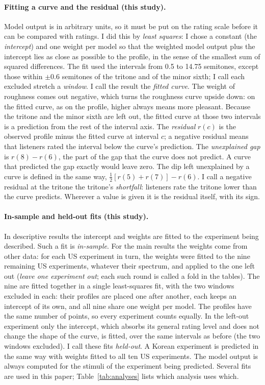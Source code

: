 \documentclass[11pt,a4paper]{article}
\begin{document}
\paragraph{Fitting a curve and the residual (this study).}
Model output is in arbitrary units, so it must be put on the rating scale before it can be
compared with ratings. I did this by \emph{least squares}: I chose a constant (the
\emph{intercept}) and one weight per model so that the weighted model output plus the
intercept lies as close as possible to the profile, in the sense of the smallest sum of
squared differences. The fit used the intervals from 0.5 to 14.75 semitones, except those
within $\pm0.6$ semitones of the tritone and of the minor sixth; I call each excluded stretch a
\emph{window}. I call the result the
\emph{fitted curve}. The weight of roughness comes out negative, which turns the roughness
curve upside down: on the fitted curve, as on the profile, higher always means more pleasant. Because the tritone and the minor sixth are left out, the fitted curve
at those two intervals is a prediction from the rest of the interval axis. The
\emph{residual} $r(c)$ is the observed profile minus the fitted curve at interval $c$; a
negative residual means that listeners rated the interval below the curve's prediction. The
\emph{unexplained gap} is $r(8)-r(6)$, the part of the gap that the curve does not predict.
A curve that predicted the gap exactly would leave zero. The dip left unexplained by a curve
is defined in the same way, $\tfrac12[r(5)+r(7)]-r(6)$. I call a negative residual at the
tritone the tritone's \emph{shortfall}: listeners rate the tritone lower than the curve
predicts. Wherever a value is given it is the residual itself, with its sign.

\paragraph{In-sample and held-out fits (this study).}
In descriptive results the intercept and weights are fitted to the
experiment being described. Such a fit is \emph{in-sample}. For the main results the weights
come from other data: for each US experiment in turn, the weights were fitted to the
nine remaining US experiments, whatever their spectrum, and applied to the one left out (\emph{leave one experiment out}; each such round is called a fold in the tables).
The nine are fitted together in a single least-squares fit, with the two windows excluded in each: their profiles are placed one
after another, each keeps an intercept of its own, and all nine share one weight per model.
The profiles have the same number of points, so every experiment counts equally. In the
left-out experiment only the intercept, which absorbs its general rating level and does not
change the shape of the curve, is fitted, over the same intervals as before (the two windows
excluded). I call these fits \emph{held-out}. A Korean experiment is predicted in the same way
with weights fitted to all ten US experiments. The model output is always computed for the
stimuli of the experiment being predicted. Several fits are used in this paper;
Table~\ref{tab:analyses} lists which analysis uses which.
\end{document}

